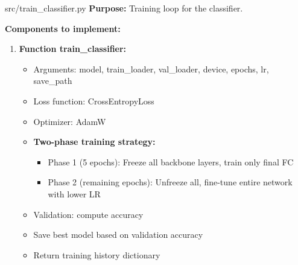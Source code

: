 \documentclass[11pt,a4paper]{article}
\begin{document}
\vspace{0.5cm}

\begin{filebox}{src/train\_classifier.py}
\textbf{Purpose:} Training loop for the classifier.

\textbf{Components to implement:}
\begin{enumerate}[noitemsep]
    \item \textbf{Function train\_classifier:}
    \begin{itemize}[noitemsep]
        \item Arguments: model, train\_loader, val\_loader, device, epochs, lr, save\_path
        \item Loss function: CrossEntropyLoss
        \item Optimizer: AdamW
        \item \textbf{Two-phase training strategy:}
        \begin{itemize}[noitemsep]
            \item Phase 1 (5 epochs): Freeze all backbone layers, train only final FC
            \item Phase 2 (remaining epochs): Unfreeze all, fine-tune entire network with lower LR
        \end{itemize}
        \item Validation: compute accuracy
        \item Save best model based on validation accuracy
        \item Return training history dictionary
    \end{itemize}
\end{enumerate}
\end{filebox}

\newpage
\end{document}
